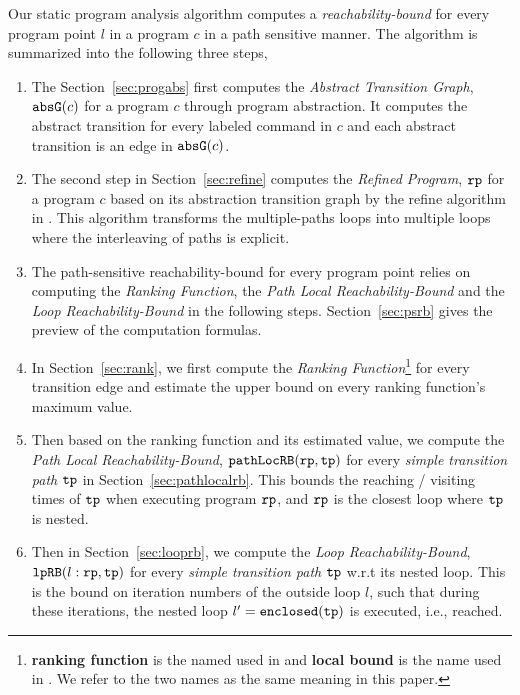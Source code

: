 Our static program analysis algorithm computes 
a \emph{reachability-bound} for every program point $l$ in a program $c$ in a path sensitive manner.
The algorithm is summarized into the following three steps,
\begin{enumerate}
\item  The Section~\ref{sec:progabs} first 
computes the \emph{Abstract Transition Graph}, $\mathtt{abs}{\mathtt{G}}(c)$ for a program $c$ through program abstraction.
It computes the abstract transition 
for every labeled command in $c$ and each abstract transition is an edge in $\mathtt{abs}{\mathtt{G}}(c)$.
\item The second step in Section~\ref{sec:refine}
computes the \emph{Refined Program}, $\mathtt{rp}$ for a program $c$ based on 
its abstraction transition graph by the refine algorithm in \cite{GulwaniJK09}.
This algorithm transforms the multiple-paths loops
into multiple loops where
the interleaving of paths is explicit.
\item The path-sensitive reachability-bound for every program point relies on computing the \emph{Ranking Function}, the \emph{Path Local Reachability-Bound} and the \emph{Loop Reachability-Bound}  in the following steps.
Section~\ref{sec:psrb} gives the preview of the computation formulas. 
    \item In Section~\ref{sec:rank}, we first compute the \emph{Ranking Function}\footnote{\textbf{ranking function} is the named used in \cite{SinnZV14}
    and \textbf{local bound} is the name used in \cite{ZulegerGSV11, SinnZV17}.
    We refer to the two names as the same meaning in this paper.}  for every transition edge 
    and estimate the upper bound on every ranking function's maximum value.
    \item Then based on the ranking function and its estimated value, we compute the \emph{Path Local Reachability-Bound}, $\mathtt{pathLocRB}(\mathtt{rp}, \mathtt{tp})$ for every \emph{simple transition path} $\mathtt{tp}$ in Section~\ref{sec:pathlocalrb}. 
    This bounds the reaching / visiting times of $\mathtt{tp}$ when executing program $\mathtt{rp}$, and $\mathtt{rp}$ is the closest loop where $\mathtt{tp}$ is nested.
    \item Then in Section~\ref{sec:looprb}, we compute the \emph{Loop Reachability-Bound}, $\mathtt{lpRB}(l: \mathtt{rp}, \mathtt{tp})$ for every \emph{simple transition path} $\mathtt{tp}$
    w.r.t its nested loop. 
    This is the bound on iteration numbers of the outside loop $l$,
    such that during these iterations, the nested loop $l' = \mathtt{enclosed(\mathtt{tp})}$ is executed, i.e., reached.

\end{enumerate}
